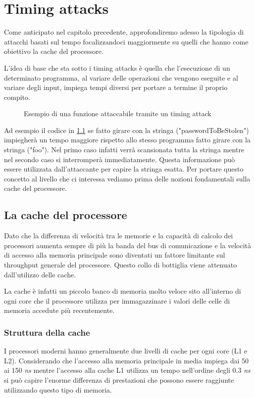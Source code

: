 \chapter{Timing attacks}
	Come anticipato nel capitolo precedente, approfondiremo adesso la tipologia di attacchi basati sul tempo focalizzandoci maggiormente su quelli che hanno come obiettivo la cache del processore. 
	
	L'idea di base che sta sotto i timing attacks è quella che l'esecuzione di un determinato programma, al variare delle operazioni che vengono eseguite e al variare degli input, impiega tempi diversi per portare a termine il proprio compito.
	
	\begin{figure}
		\begin{center}
			
			\caption{Esempio di una funzione attaccabile tramite un timing attack}
			\label{fig:timingBase}
		\end{center}
	\end{figure}
	
	Ad esempio il codice in \cref{fig:timingBase} se fatto girare con la stringa ("passwordToBeStolen") impiegherà un tempo maggiore rispetto allo stesso programma fatto girare con la stringa ("foo"). Nel primo caso infatti verrà scansionata tutta la stringa mentre nel secondo caso si interromperà immediatamente. Questa informazione può essere utilizzata dall'attaccante per capire la stringa esatta. Per portare questo concetto al livello che ci interessa vediamo prima delle nozioni fondamentali sulla cache del processore. 
	
	\section{La cache del processore}
		Dato che la differenza di velocità tra le memorie e la capacità di calcolo dei processori aumenta sempre di più \cite{hennessy2011computer} la banda del bus di comunicazione e la velocità di accesso alla memoria principale sono diventati un fattore limitante sul throughput generale del processore. Questo collo di bottiglia viene attenuato dall'utilizzo delle cache. 
		
		La cache è infatti un piccolo banco di memoria molto veloce sito all'interno di ogni core che il processore utilizza per immagazzinare i valori delle celle di memoria accedute più recentemente. 
		
		\subsection{Struttura della cache}
			I processori moderni hanno generalmente due livelli di cache per ogni core (L1 e L2). Considerando che l'accesso alla memoria principale in media impiega dai 50 ai 150 \emph{ns} mentre l'accesso alla cache L1 utilizza un tempo nell'ordine degli 0.3 \emph{ns} si può capire l'enorme differenza di prestazioni che possono essere raggiunte utilizzando questo tipo di memoria.
		
